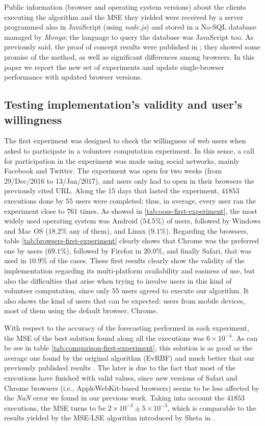 \documentclass{article}
\begin{document}
Public information (browser and operating system versions) about the clients executing the algorithm and the MSE they yielded were received
by a server programmed also in JavaScript (using {\em node.js}) and
stored in a No-SQL database managed by {\em Mongo}; the language to
query the database was JavaScript too. As previously said, the proof of concept results
were published in \cite{DBLP:conf/dcai/2016de}; they showed some
promise of the method, as well as significant differences among
browsers. In this paper we report the new set of experiments and update
single-browser performance with updated browser versions.


\subsection{Testing implementation's validity and user's willingness}
\label{sec:first-experiment}

The first experiment was designed to check the willingness of web
users when asked to participate in a volunteer computation
experiment. In this sense, a call for participation in the experiment was
made using social networks, mainly Facebook and Twitter. The experiment was
open for two weeks (from 29/Dec/2016 to 13/Jan/2017), and users only
had to open in their browsers the previously cited URL.
Along the 15 days that lasted the experiment, $41853$ executions done
by $55$ users were completed; thus, in average, every user ran the
experiment close to $761$ times.
As showed in \ref{tab:ooss-first-experiment}, the most widely used operating system was Android
($54.5\%$) of users, followed by Windows and Mac OS ($18.2\%$ any of
them), and Linux ($9.1\%$). %
Regarding the browsers, table \ref{tab:browsers-first-experiment} clearly shows that Chrome was the
preferred one by users ($69.1\%$), followed by  Firefox in $20.0\%$, and
finally Safari, that was used in $10.9\%$ of the cases. These first
results clearly show the validity of the implementation regarding its
multi-platform availability and easiness of use, but also the
difficulties that arise when trying to involve users in this kind of
volunteer computation, since only $55$ users agreed to execute our
algorithm. It also shows the kind of users that can be expected:
users from mobile devices, most of them using the default browser,
Chrome.

With respect to the accuracy of the forecasting performed in each
experiment, the MSE of the best
solution found along all the executions was $6\times 10^{-4}$. As can
be see in table \ref{tab:comparison-first-experiment}, this solution
is as good as the average one found by the original algorithm (EvRBF)
and much better that our previously published results \cite{DBLP:conf/dcai/RivasPMAG16}. The later is due to the fact that most of the executions have
finished with valid values, since new versions of Safari and Chrome
browsers (i.e., AppleWebKit-based browsers) seems to be less affected by the
{\em NaN} error we found in our previous work. Taking into account the
$41853$ executions, the MSE turns to be $2 \times
10^{-3}\pm 5\times 10^{-3}$, which is comparable to the results yielded
by the MSE-LSE algorithm introduced by Sheta in \cite{Sheta2001}.
\end{document}

